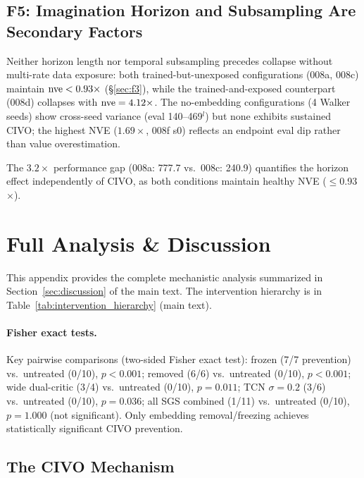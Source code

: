 \subsection{F5: Imagination Horizon and Subsampling Are Secondary Factors}
\label{sec:f5}

Neither horizon length nor temporal subsampling precedes collapse without multi-rate data exposure: both trained-but-unexposed configurations (008a, 008c) maintain $\mathrm{nve} < 0.93\times$ (\S\ref{sec:f3}), while the trained-and-exposed counterpart (008d) collapses with $\mathrm{nve} = 4.12\times$.  The no-embedding configurations (4 Walker seeds) show cross-seed variance (eval 140--469$^l$) but none exhibits sustained CIVO; the highest NVE ($1.69\times$, 008f s0) reflects an endpoint eval dip rather than value overestimation.

The $3.2\times$ performance gap (008a: 777.7 vs.\ 008c: 240.9) quantifies the horizon effect independently of CIVO, as both conditions maintain healthy NVE ($\leq$0.93$\times$).


\section{Full Analysis \& Discussion}
\label{sec:appendix_analysis}

This appendix provides the complete mechanistic analysis summarized in Section~\ref{sec:discussion} of the main text. The intervention hierarchy is in Table~\ref{tab:intervention_hierarchy} (main text).

\paragraph{Fisher exact tests.}
Key pairwise comparisons (two-sided Fisher exact test): frozen (7/7 prevention) vs.\ untreated (0/10), $p < 0.001$; removed (6/6) vs.\ untreated (0/10), $p < 0.001$; wide dual-critic (3/4) vs.\ untreated (0/10), $p = 0.011$; TCN $\sigma{=}0.2$ (3/6) vs.\ untreated (0/10), $p = 0.036$; all SGS combined (1/11) vs.\ untreated (0/10), $p = 1.000$ (not significant). Only embedding removal/freezing achieves statistically significant CIVO prevention.

\subsection{The CIVO Mechanism}
\label{sec:civo_mechanism}

